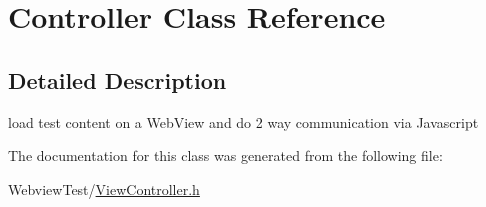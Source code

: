 \hypertarget{class_controller}{\section{Controller Class Reference}
\label{class_controller}
}


\subsection{Detailed Description}
load test content on a Web\-View and do 2 way communication via Javascript 

The documentation for this class was generated from the following file\-:\begin{DoxyCompactItemize}
\item 
Webview\-Test/\hyperlink{_view_controller_8h}{View\-Controller.\-h}\end{DoxyCompactItemize}
